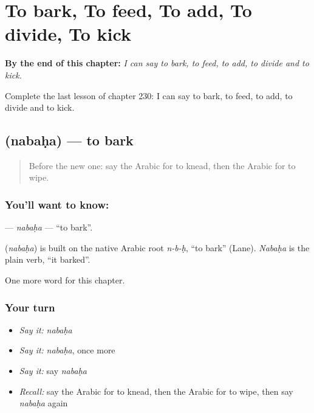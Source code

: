 
\chapter{To bark, To feed, To add, To divide, To kick}
\label{ch:ar-to-bark-to-feed-to-add-to-divide-to-kick}

\begin{chapteropening}
\textbf{By the end of this chapter:} \emph{I can say to bark, to feed, to add, to divide and to kick.}

Complete the last lesson of chapter 230: I can say to bark, to feed, to add, to divide and to kick.
\end{chapteropening}

\section[\texorpdfstring{\ar{نبح} (nabaḥa)}{نبح (nabaḥa)}]{ (nabaḥa) — to bark}

\label{lesson:AR-C230-nabaha}



\begin{quote}
Before the new one: say the Arabic for to knead, then the Arabic for to wipe.
\end{quote}

\subsection*{You'll want to know: }
\textbf{} — \emph{nabaḥa} — \textquotedblleft{}to bark\textquotedblright{}.

\begin{cousinweb}
\textbf{} (\emph{nabaḥa}) is built on the native Arabic root \emph{n-b-ḥ}, \textquotedblleft{}to bark\textquotedblright{} (Lane). \emph{Nabaḥa} is the plain verb, \textquotedblleft{}it barked\textquotedblright{}.
\end{cousinweb}

\begin{grammarlens}[title={What you've built}]
One more word for this chapter.
\end{grammarlens}

\subsection*{Your turn}
\begin{itemize}
\raggedright
  \item \emph{Say it:} \emph{nabaḥa}
  \item \emph{Say it:} \emph{nabaḥa}, once more
  \item \emph{Say it:} say \emph{nabaḥa}
  \item \emph{Recall:} say the Arabic for to knead, then the Arabic for to wipe, then say \emph{nabaḥa} again
\end{itemize}

